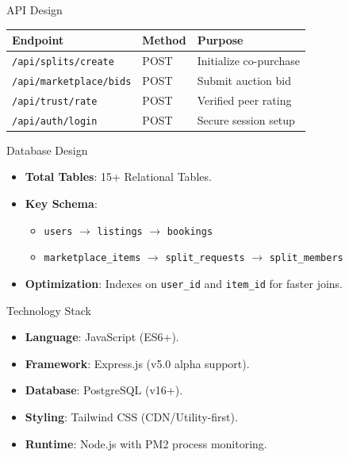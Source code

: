 \documentclass[10pt]{beamer}
\begin{document}
\begin{frame}{API Design}
    \footnotesize
    \begin{tabular}{llp{4cm}}
    \toprule
    \textbf{Endpoint} & \textbf{Method} & \textbf{Purpose} \\
    \midrule
    \texttt{/api/splits/create} & POST & Initialize co-purchase \\
    \texttt{/api/marketplace/bids} & POST & Submit auction bid \\
    \texttt{/api/trust/rate} & POST & Verified peer rating \\
    \texttt{/api/auth/login} & POST & Secure session setup \\
    \bottomrule
    \end{tabular}
\end{frame}

\begin{frame}{Database Design}
    \begin{itemize}
        \item \textbf{Total Tables}: 15+ Relational Tables.
        \item \textbf{Key Schema}: 
            \begin{itemize}
                \item \texttt{users} $\rightarrow$ \texttt{listings} $\rightarrow$ \texttt{bookings}
                \item \texttt{marketplace\_items} $\rightarrow$ \texttt{split\_requests} $\rightarrow$ \texttt{split\_members}
            \end{itemize}
        \item \textbf{Optimization}: Indexes on \texttt{user\_id} and \texttt{item\_id} for faster joins.
    \end{itemize}
\end{frame}

\begin{frame}{Technology Stack}
    \begin{itemize}
        \item \textbf{Language}: JavaScript (ES6+).
        \item \textbf{Framework}: Express.js (v5.0 alpha support).
        \item \textbf{Database}: PostgreSQL (v16+).
        \item \textbf{Styling}: Tailwind CSS (CDN/Utility-first).
        \item \textbf{Runtime}: Node.js with PM2 process monitoring.
    \end{itemize}
\end{frame}
\end{document}

